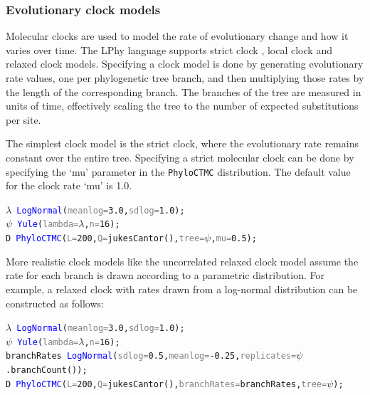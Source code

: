 \documentclass[10pt,letterpaper,table]{article}
\theoremstyle{definition}
\begin{document}
\subsubsection{Evolutionary clock models}
\label{sec:clockmodels}

Molecular clocks are used to model the rate of evolutionary change and how it varies over time. 
The LPhy language supports strict clock \cite{zuckerkandl1965evolutionary, zuckerkandl1965molecules}, local clock \cite{drummond2010bayesian} and relaxed clock \cite{drummond2006relaxedconfidence} models. 
Specifying a clock model is done by generating evolutionary rate values, one per phylogenetic tree branch, and then multiplying those rates by the length of the corresponding branch. 
The branches of the tree are measured in units of time, effectively scaling the tree to the number of expected substitutions per site. 

The simplest clock model is the strict clock, where the evolutionary rate remains constant over the entire tree. 
Specifying a strict molecular clock can be done by specifying the `mu' parameter in the \texttt{PhyloCTMC} distribution.
The default value for the clock rate `mu' is 1.0.
{\small
\begin{alltt}
    \textcolor{bluishgreen}{\(\lambda\)} ~ \textcolor{blue}{LogNormal}(\textcolor{gray}{meanlog=}\textcolor{constant}{3.0}, \textcolor{gray}{sdlog=}\textcolor{constant}{1.0});
    \textcolor{bluishgreen}{\(\psi\)} ~ \textcolor{blue}{Yule}(\textcolor{gray}{lambda=}\textcolor{bluishgreen}{\(\lambda\)}, \textcolor{gray}{n=}\textcolor{constant}{16});
    \textcolor{bluishgreen}{D} ~ \textcolor{blue}{PhyloCTMC}(\textcolor{gray}{L=}\textcolor{constant}{200}, \textcolor{gray}{Q=}\textcolor{generator}{jukesCantor}(), \textcolor{gray}{tree=}\textcolor{bluishgreen}{\(\psi\)}, \textcolor{gray}{mu=}\textcolor{constant}{0.5});
\end{alltt}
}
More realistic clock models like the uncorrelated relaxed clock model \cite{drummond2006relaxedconfidence} assume the rate for each branch is drawn according to a parametric distribution. 
For example, a relaxed clock with rates drawn from a log-normal distribution can be constructed as follows:

{
\small
\begin{alltt}
  \textcolor{bluishgreen}{\(\lambda\)} ~ \textcolor{blue}{LogNormal}(\textcolor{gray}{meanlog=}\textcolor{constant}{3.0}, \textcolor{gray}{sdlog=}\textcolor{constant}{1.0});
  \textcolor{bluishgreen}{\(\psi\)} ~ \textcolor{blue}{Yule}(\textcolor{gray}{lambda=}\textcolor{bluishgreen}{\(\lambda\)}, \textcolor{gray}{n=}\textcolor{constant}{16});
  \textcolor{bluishgreen}{branchRates} ~ \textcolor{blue}{LogNormal}(\textcolor{gray}{sdlog=}\textcolor{constant}{0.5}, \textcolor{gray}{meanlog=}\textcolor{constant}{-0.25}, \textcolor{gray}{replicates=}\textcolor{bluishgreen}{\(\psi\)}.\textcolor{generator}{branchCount}());
  \textcolor{bluishgreen}{D} ~ \textcolor{blue}{PhyloCTMC}(\textcolor{gray}{L=}\textcolor{constant}{200}, \textcolor{gray}{Q=}\textcolor{generator}{jukesCantor}(), \textcolor{gray}{branchRates=}\textcolor{bluishgreen}{branchRates}, \textcolor{gray}{tree=}\textcolor{bluishgreen}{\(\psi\)});
\end{alltt}
}
\end{document}
